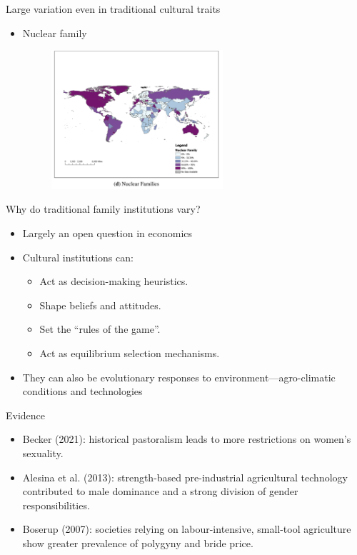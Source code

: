 \documentclass[11pt,notes=hide,aspectratio=169,mathserif]{beamer}
\begin{document}
\begin{frame}{Large variation even in traditional cultural traits}
\begin{itemize}
  \item Nuclear family
  \begin{figure}
    \centering
    \includegraphics[width=0.6\textwidth]{nuclear.png}
  \end{figure}
\end{itemize}
\end{frame}

\begin{frame}{Why do traditional family institutions vary?}
\begin{itemize}
  \item Largely an open question in economics
  \item Cultural institutions can:
  \begin{itemize}
    \item Act as decision-making heuristics.
    \item Shape beliefs and attitudes.
    \item Set the “rules of the game”.
    \item Act as equilibrium selection mechanisms.
  \end{itemize}
  \item They can also be evolutionary responses to environment—agro-climatic conditions and technologies
\end{itemize}
\end{frame}

\begin{frame}{Evidence}
\begin{itemize}
  \item Becker (2021): historical pastoralism leads to more restrictions on women's sexuality.
  \item Alesina et al. (2013): strength-based pre-industrial agricultural technology contributed to male dominance and a strong division of gender responsibilities.
  \item Boserup (2007): societies relying on labour-intensive, small-tool agriculture show greater prevalence of polygyny and bride price.
\end{itemize}
\end{frame}
\end{document}
